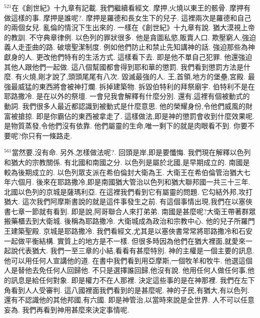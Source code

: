 \documentclass{book}
\begin{document}
$^{521}$在《創世紀》十九章有記載.
我們繼續看經文.
摩押,火燒以東王的骸骨.
摩押有做這樣的事.
摩押是誰呢?.
摩押是羅德和長女生下的兒子.
這裡兩次是羅德和自己的兩個女兒.
亂倫的情況下生出來的.
一樣在《創世紀》十九章有說.
猶大漠視上帝的教訓.
不守典章律例.
以色列的罪狀很多.
他是貪圖私慾,販賣人口.
欺壓窮人,強迫義人走歪曲的路.
破壞聖潔制度.
例如他們防止和禁止先知講神的話.
強迫那些為神獻身的人.
更改他們特有的生活方式.
這樣看下去.
即是他不單自己犯罪.
他還強迫其他人跟他們一起做.
這八個幫國都會得到耶和華的懲罰.
我們看到懲罰方法是什麼.
有火燒,剛才說了,頭頭尾尾有八次.
毀滅最強的人.
王,首領,地方的堡壘,宮殿.
最強最威猛的東西將會被神打爛.
拆掉建築物.
拆毀伯特利的拜祭廟宇.
伯特利不是在耶路撒冷.
是在以外的祭壇.
一會兒我會解釋有什麼分別.
還有,這裡有個被動式的動詞.
我們很多人最近都認識到被動式是什麼意思.
他的榮耀身份,令他們威風的財富被搶掠.
即是你霸佔的東西被拿走了.
這樣做法,即是神的懲罰會收到什麼效果呢.
是物質蒸發,令他們沒有依靠.
他們屬靈的生命,唯一剩下的就是肉眼看不到.
你要不要呢?你只有一條路走.

$^{561}$當然要,沒有命.
另外,怎樣做法呢?.
回頭是岸,即是要懺悔.
我們現在解釋以色列和猶大的宗教關係.
有北國和南國之分.
以色列是屬於北國,是早期成立的.
南國是較為後期成立的.
以色列眾支派在希伯倫封大衛為王.
大衛王在希伯倫管治猶大七年六個月.
後來在耶路撒冷,即是南國猶大管治以色列和猶大聯邦國一共三十三年.
北國以色列的京城是薩瑪利亞.
在這裡我們看到它有屬靈的問題.
它勾結外邦,攻打猶大.
這次我們阿摩斯書說的就是這件事發生之前.
有這個事情出現,我們在以塞俠書七章一節就有看到.
即是說,阿哥聯合人來打弟弟.
南國是甚麼呢?大衛王帶著群眾搬藥櫃去到大衛城.
後稱為耶路撒冷.
大衛城成為政治和宗教中心.
他的兒子所羅門王建築聖殿.
京城是耶路撒冷.
我們看經文,尤其是以塞俠書常常將耶路撒冷和石安一起做平衡結構.
實質上的地方是不一樣.
但很多時因為他們在猶大裡面,就愛來一起說代表猶大.
我們一至三章的小結,看看有甚麼特別.
神的主權是一個主要的訊息.
他可以用任何人宣講他的道.
在書中我們看到用亞摩斯,一個牧羊和牧牛.
他選這個人是替他去免任何人回歸他.
不只是選擇誰回歸,他沒有說.
他用任何人做任何事,他的訊息是給任何對象.
即是權力不在人那裡.
決定這些事的是在神那裡.
我們在左下角看到人人受審判.
這八國裡面我們看到的是甚麼呢.
神的子民,有猶大,有以色列.
還有不認識他的其他邦國,有六國.
即是神管治,以當時來說是全世界.
人不可以任意妄為.
我們再看到神用甚麼來決定事情呢.
\end{document}
